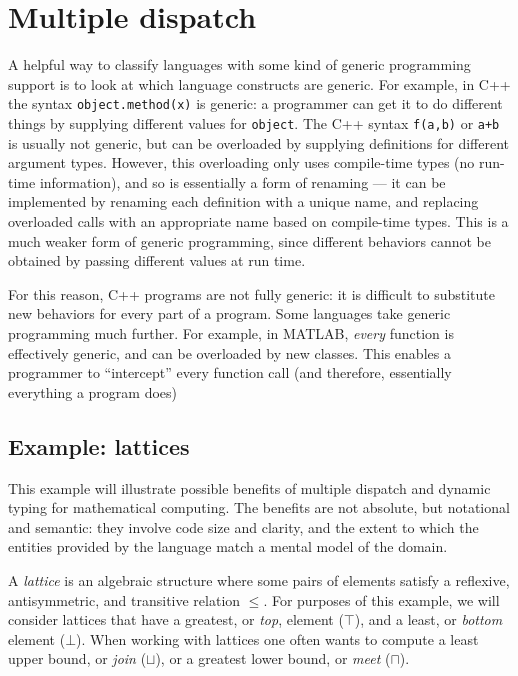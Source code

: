 \section{Multiple dispatch}



A helpful way to classify languages with some kind of generic programming
support is to look at which language constructs are generic. For example,
in C++ the syntax \texttt{object.method(x)} is generic: a programmer can
get it to do different things by supplying different values for
\texttt{object}. The C++ syntax \texttt{f(a,b)} or \texttt{a+b} is
usually not generic, but can be overloaded by supplying definitions for
different argument types. However, this overloading only uses compile-time
types (no run-time information), and so is essentially a form of renaming ---
it can be implemented by renaming each definition with a unique name, and
replacing overloaded calls with an appropriate name based on compile-time
types. This is a much weaker form of generic programming, since different
behaviors cannot be obtained by passing different values at run time.

For this reason, C++ programs are not fully generic: it is difficult to
substitute new behaviors for every part of a program. Some languages
take generic programming much further. For example, in MATLAB, \emph{every}
function is effectively generic, and can be overloaded by new classes.
This enables a programmer to ``intercept'' every function call (and therefore,
essentially everything a program does)


\subsection{Example: lattices}

This example will illustrate possible benefits of multiple dispatch and
dynamic typing for mathematical computing.
The benefits are not absolute, but notational and semantic:
they involve code size and clarity, and the extent to which the entities
provided by the language match a mental model of the domain.

A \emph{lattice} is an algebraic structure where some pairs of elements
satisfy a reflexive, antisymmetric, and transitive relation $\leq$.
For purposes of this example, we will consider lattices that have
a greatest, or \emph{top}, element ($\top$), and a least, or \emph{bottom}
element ($\bot$). When working with lattices one often wants to compute
a least upper bound, or \emph{join} ($\sqcup$), or a greatest lower bound,
or \emph{meet} ($\sqcap$).

